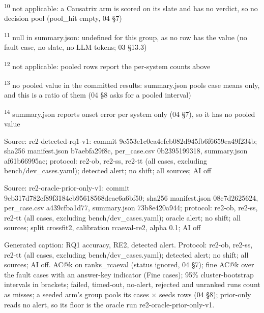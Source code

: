\textsuperscript{10} not applicable: a Causatrix arm is scored on its slate and has no verdict, so no decision pool (pool\_hit empty, 04 \S{}7)\par
\textsuperscript{11} null in summary.json: undefined for this group, as no row has the value (no fault case, no slate, no LLM tokens; 03 \S{}13.3)\par
\textsuperscript{12} not applicable: pooled rows report the per-system counts above\par
\textsuperscript{13} no pooled value in the committed results: summary.json pools case means only, and this is a ratio of them (04 \S{}8 asks for a pooled interval)\par
\textsuperscript{14} summary.json reports onset error per system only (04 \S{}7), so it has no pooled value\par
\noindent Source: re2-detected-rq1-v1: commit 9e553e1c0ca4efcb082d945fb6f6659ea49f234b; sha256 manifest.json b7aebfa29f8c, per\_case.csv 0b2395199318, summary.json af61b66995ac; protocol: re2-ob, re2-ss, re2-tt (all cases, excluding bench/\allowbreak{}dev\_cases.yaml); detected alert; no shift; all sources; AI off\par
\noindent Source: re2-oracle-prior-only-v1: commit 9cb317d782cf89f3184cb95618568dcae6a6bf50; sha256 manifest.json 08c7d2625624, per\_case.csv a439cfba1d77, summary.json 73b8e420a944; protocol: re2-ob, re2-ss, re2-tt (all cases, excluding bench/\allowbreak{}dev\_cases.yaml); oracle alert; no shift; all sources; split crossfit2, calibration rcaeval-re2, alpha 0.1; AI off\par
\noindent Generated caption: RQ1 accuracy, RE2, detected alert. Protocol: re2-ob, re2-ss, re2-tt (all cases, excluding bench/\allowbreak{}dev\_cases.yaml); detected alert; no shift; all sources; AI off. AC@k on ranks\_rcaeval (status ignored, 04 \S{}7); fine AC@k over the fault cases with an answer-key indicator (Fine cases); 95\% cluster-bootstrap intervals in brackets; failed, timed-out, no-alert, rejected and unranked runs count as misses; a seeded arm's group pools its cases $\times$ seeds rows (04 \S{}8); prior-only reads no alert, so its floor is the oracle run re2-oracle-prior-only-v1.\par
\endgroup
